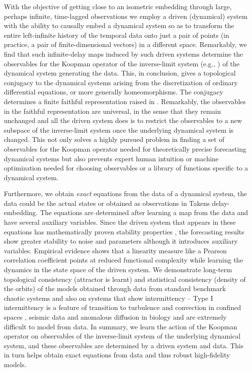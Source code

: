 \documentclass[12 pt]{article}
\begin{document}
With the objective of getting close to an isometric embedding through large, perhaps infinite, time-lagged observations we employ a driven (dynamical) system with the ability to causally embed a dynamical system so as to transform the entire left-infinite history of the temporal data onto just a pair of points (in practice, a pair of finite-dimensional vectors) in a different space. 
Remarkably, we find that such infinite-delay maps induced by such driven systems determine the observables for the Koopman operator of the inverse-limit system (e.g., \cite{ingram2011inverse}) of the dynamical system generating the data.  
This, in conclusion, gives a topological conjugacy to the dynamical systems arising 
from the discretization of ordinary differential equations, or more generally homeomorphisms. The conjugacy determines a finite faithful representation raised in \cite{mezic2020koopman}. Remarkably, the observables in the faithful representation are universal, in the sense that they remain unchanged and all the driven system does is to restrict the observables to a new subspace of the inverse-limit system once the underlying dynamical system is changed.  This not only solves a highly pursued problem in finding a set of observables for the Koopman operator needed for theoretically precise forecasting dynamical systems but also prevents expert human intuition or machine optimization needed for choosing observables or a library of functions specific to a dynamical system.


Furthermore, we obtain \emph{exact} equations from the data of a dynamical system, the data could be the actual states or obtained as observations in Takens delay-embedding. The equations are determined after learning a map from the data and have several auxiliary variables. Since the driven system that appears in these equations has mathematically proven stability properties \cite{manjunath2013echo, grigoryeva2018echo}, the forecasting results show greater stability to noise and parameters although it introduces auxiliary variables. Empirical evidence shows that a linearity measure like a Pearson correlation coefficient points at reduced functional complexity while learning the dynamics in the state space of the driven system.  
We demonstrate long-term topological 
consistency (attractor is learnt)
and statistical consistency (density of the orbits) of the models obtained through data from standard benchmark chaotic systems and also on systems that show intermittency -- Type I intermittency is a feature of transition to turbulence and convection in confined spaces \cite{pomeau1980intermittent}, seismic data \cite{bottiglieri2007off} and anomalous diffusion in biology \cite{klages2013weak} and are extremely difficult to model from data.  In summary, we learn the action of the Koopman operator on observables of the inverse-limit system of the underlying dynamical system, and these observables are determined by a driven system and data. 
This in turn helps obtain exact equations from data and thus robust high-fidelity models.
\end{document}
